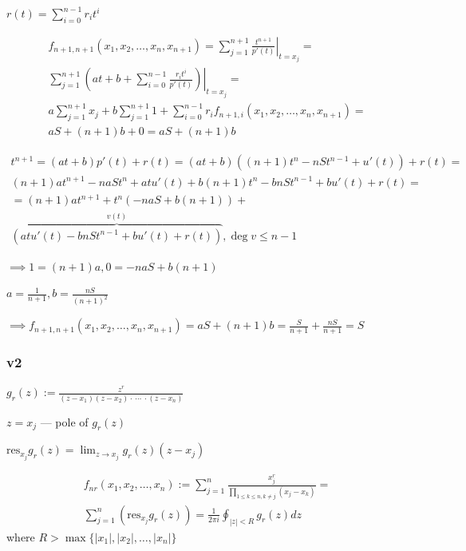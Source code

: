 \documentclass{article}
\begin{document}
\( r(t) = \sum_{i=0}^{n-1}r_{i}t^{i} \)

\begin{multline*}
f_{n+1,n+1}(x_{1},x_{2},\ldots,x_{n},x_{n+1}) = \sum_{j=1}^{n+1} \left.\frac{t^{n+1}}{p'(t)}\right|_{t = x_{j}} = \\
\sum_{j=1}^{n+1} \left.(at + b + \sum_{i=0}^{n-1}\frac{r_{i} t^{i}}{p'(t)})\right|_{t = x_{j}} = \\
a \sum_{j=1}^{n+1} x_{j} + b \sum_{j=1}^{n+1} 1 + \sum_{i=0}^{n-1} r_{i} f_{n+1,i}(x_{1},x_{2},\ldots,x_{n},x_{n+1}) = \\
aS + (n+1)b + 0 = aS + (n+1)b
\end{multline*}

\begin{multline*}
t^{n+1} = (at+b)p'(t) + r(t) = (at+b)((n+1)t^{n} - nSt^{n-1} + u'(t)) + r(t) = \\
(n+1)at^{n+1} - naSt^{n} + atu'(t) + b(n+1)t^{n} - bnSt^{n-1} + bu'(t) + r(t) = \\
= (n+1)at^{n+1} + t^{n}(-naS+b(n+1)) + \\
\overbrace{(atu'(t)-bnSt^{n-1} + bu'(t) + r(t))}^{v(t)}, \deg v \leq n - 1
\end{multline*}

\( \implies 1 = (n+1)a, 0 = -naS + b(n+1) \)

\( a = \frac{1}{n+1}, b = \frac{nS}{{(n+1)}^{2}} \)

\( \implies f_{n+1,n+1}(x_{1},x_{2},\ldots,x_{n},x_{n+1}) = aS + (n+1)b = \frac{S}{n+1} + \frac{nS}{n+1} = S \)

\subsubsection*{v2}

\( g_{r}(z) := \frac{z^{r}}{(z-x_{1})(z-x_{2}) \cdot\ \cdots\ \cdot (z-x_{n})} \)

\( z=x_{j} \) --- pole of \( g_{r}(z) \)

\( \mathrm{res}_{x_{j}}g_{r}(z) = \lim_{z\to x_{j}} g_{r}(z)(z-x_{j}) \)

\begin{multline*}
f_{nr} (x_{1},x_{2},\ldots,x_{n}) := \sum_{j=1}^{n}\frac{x_{j}^{r}}{\prod_{1 \leq k \leq n, k \neq j}(x_{j}-x_{k})} = \\
\sum_{j=1}^{n} (\mathrm{res}_{x_{j}}g_{r}(z)) = \frac{1}{2\pi i}\oint_{|z|<R}g_{r}(z)dz
\end{multline*}
where \( R > \max\{|x_{1}|,|x_{2}|,\ldots,|x_{n}|\} \)
\end{document}
